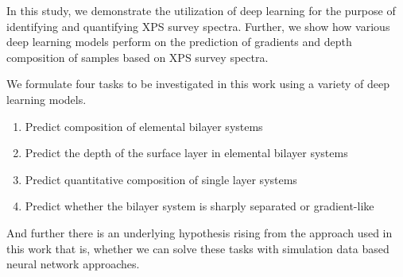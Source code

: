
In this study, we demonstrate the utilization of deep learning for the purpose of identifying and quantifying XPS survey spectra. Further, we show how various deep learning models perform on the prediction of gradients and depth composition of samples based on XPS survey spectra.

We formulate four tasks to be investigated in this work using a variety of deep learning models.
\begin{enumerate}
    \item Predict composition of elemental bilayer systems
    \item Predict the depth of the surface layer in elemental bilayer systems 
    \item Predict quantitative composition of single layer systems
    \item Predict whether the bilayer system is sharply separated or gradient-like 
\end{enumerate}
And further there is an underlying hypothesis rising from the approach used in this work that is, whether we can solve these tasks with simulation data based neural network approaches.




